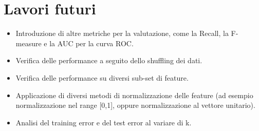 \documentclass[fleqn,10pt]{SelfArx} %
\begin{document}
\section{Lavori futuri}
\begin{itemize}
\item Introduzione di altre metriche per la valutazione, come la Recall, la F-measure e la AUC per la curva ROC.
\item Verifica delle performance a seguito dello shuffling dei dati.
\item Verifica delle performance su diversi sub-set di feature.
\item Applicazione di diversi metodi di normalizzazione delle feature (ad esempio normalizzazione nel range [0,1], oppure normalizzazione al vettore unitario).
\item Analisi del training error e del test error al variare di k.

\end{itemize}







\end{document}
